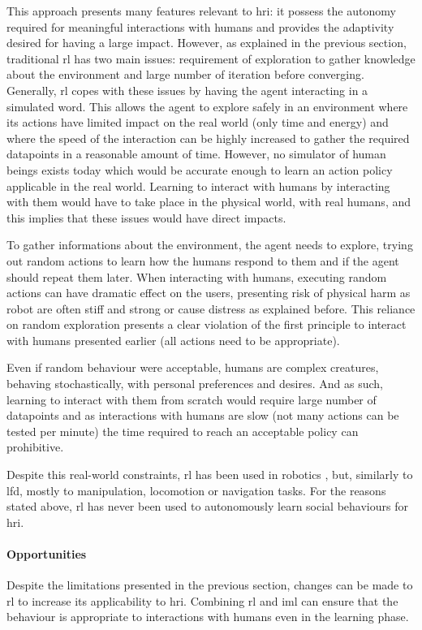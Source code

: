 	This approach presents many features relevant to \gls{hri}: it possess the autonomy required for meaningful interactions with humans and provides the adaptivity desired for having a large impact. However, as explained in the previous section, traditional \gls{rl} has two main issues: requirement of exploration to gather knowledge about the environment and large number of iteration before converging. Generally, \gls{rl} copes with these issues by having the agent interacting in a simulated word. This allows the agent to explore safely in an environment where its actions have limited impact on the real world (only time and energy) and where the speed of the interaction can be highly increased to gather the required datapoints in a reasonable amount of time. However, no simulator of human beings exists today which would be accurate enough to learn an action policy applicable in the real world. Learning to interact with humans by interacting with them would have to take place in the physical world, with real humans, and this implies that these issues would have direct impacts. 
	
	To gather informations about the environment, the agent needs to explore, trying out random actions to learn how the humans respond to them and if the agent should repeat them later. When interacting with humans, executing random actions can have dramatic effect on the users, presenting risk of physical harm as robot are often stiff and strong or cause distress as explained before. This reliance on random exploration presents a clear violation of the first principle to interact with humans presented earlier (all actions need to be appropriate).
	
	Even if random behaviour were acceptable, humans are complex creatures, behaving stochastically, with personal preferences and desires. And as such, learning to interact with them from scratch would require large number of datapoints and as interactions with humans are slow (not many actions can be tested per minute) the time required to reach an acceptable policy can prohibitive. 
	
	Despite this real-world constraints, \gls{rl} has been used in robotics \citep{kober2013reinforcement}, but, similarly to \gls{lfd}, mostly to manipulation, locomotion or navigation tasks. For the reasons stated above, \gls{rl} has never been used to autonomously learn social behaviours for \gls{hri}. 
	
	\paragraph{Opportunities}  
	Despite the limitations presented in the previous section, changes can be made to \gls{rl} to increase its applicability to \gls{hri}. Combining \gls{rl} and \gls{iml} can ensure that the behaviour is appropriate to interactions with humans even in the learning phase.
	
